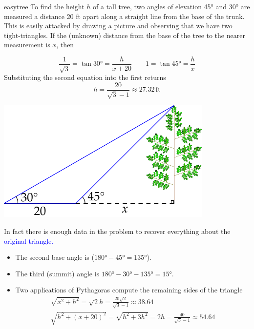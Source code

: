 \begin{example}{}{easytree}
	To find the height $h$ of a tall tree, two angles of elevation \ang{45} and \ang{30} are measured a distance 20 ft apart along a straight line from the base of the trunk.\smallbreak
	This is easily attacked by drawing a picture and observing that we have two tight-triangles. If the (unknown) distance from the base of the tree to the nearer measurement is $x$, then\par
	\begin{minipage}[t]{0.54\linewidth}\vspace{-7pt}
		\[
			\frac 1{\sqrt 3}=\tan\ang{30}=\frac h{x+20}\qquad 1=\tan\ang{45}=\frac hx
		\]
		Substituting the second equation into the first returns
		\[
			h=\frac{20}{\sqrt 3-1}\approx 27.32\,\text{ft}
		\]
	\end{minipage}
	\hfill
	\begin{minipage}[t]{0.45\linewidth}\vspace{-12pt}
		\flushright\includegraphics{tree2}
	\end{minipage}\smallbreak
		In fact there is enough data in the problem to recover everything about the \textcolor{blue}{original triangle.}
	\begin{itemize}\itemsep2pt
	  \item The second base angle is ($\ang{180}-\ang{45}=\ang{135}$).
	  \item The third (summit) angle is $\ang{180}-\ang{30}-\ang{135}=\ang{15}$.
	  \item Two applications of Pythagoras compute the remaining sides of the triangle
	  \begin{gather*}
	  	\sqrt{x^2+h^2}=\sqrt 2h=\frac{20\sqrt 2}{\sqrt 3-1}\approx 38.64\\
	  	\sqrt{h^2+(x+20)^2}=\sqrt{h^2+3h^2}=2h=\frac{40}{\sqrt 3-1}\approx 54.64
	  \end{gather*}
	\end{itemize}
\end{example}

